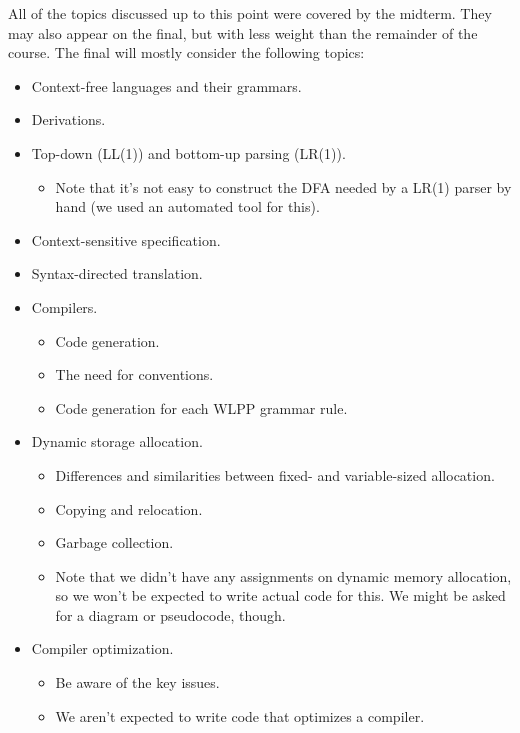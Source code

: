 \documentclass[]{article}
\theoremstyle{definition}
\begin{document}
			All of the topics discussed up to this point were covered by the midterm. They may also appear on the final, but with less weight than the remainder of the course. The final will mostly consider the following topics:
			\begin{itemize}
				\item Context-free languages and their grammars.
				\item Derivations.
				\item Top-down (LL(1)) and bottom-up parsing (LR(1)). 
					\begin{itemize}
						\item Note that it's not easy to construct the DFA needed by a LR(1) parser by hand (we used an automated tool for this).
					\end{itemize}
				\item Context-sensitive specification.
				\item Syntax-directed translation.
				\item Compilers.
					\begin{itemize}
						\item Code generation.
						\item The need for conventions.
						\item Code generation for each WLPP grammar rule.
					\end{itemize}
				\item Dynamic storage allocation.
					\begin{itemize}
						\item Differences and similarities between fixed- and variable-sized allocation.
						\item Copying and relocation.
						\item Garbage collection.
						\item Note that we didn't have any assignments on dynamic memory allocation, so we won't be expected to write actual code for this. We might be asked for a diagram or pseudocode, though.
					\end{itemize}
				\item Compiler optimization.
					\begin{itemize}
						\item Be aware of the key issues.
						\item We aren't expected to write code that optimizes a compiler.
					\end{itemize}
			\end{itemize}
			
\end{document}
